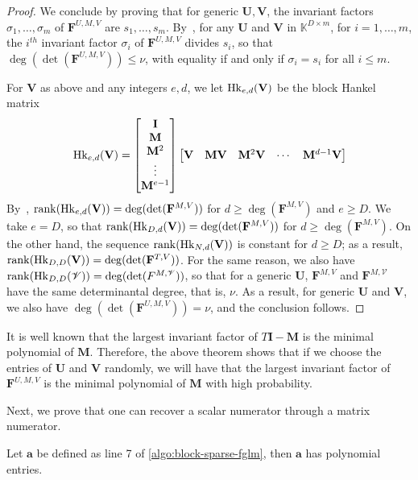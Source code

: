 \documentclass[12pt]{article}
\def\K {\ensuremath{\mathbb{K}}}
\def\scrV {\ensuremath{\mathscr{V}}}
\def\K{\mathbb{K}}
\def\mF{\mathbf{F}}
\def\mI{\mathbf{I}}
\def\mM{\mathbf{M}}
\def\mU{\mathbf{U}}
\def\mV{\mathbf{V}}
\begin{document}
\begin{proof}
	We conclude by proving that for generic $\mU,\mV$, the invariant factors
	$\sigma_1,\dots,\sigma_m$ of $\mF^{U,M,V}$ are $s_1,\dots,s_m$.
	By~\cite[Theorem~2.12]{KaVi04}, for any $\mU$ and $\mV$ in $\K^{D\times
		m}$, for $i=1,\dots,m$, the $i^{th}$ invariant factor $\sigma_i$ of
	$\mF^{U,M,V}$ divides $s_i$, so that $\deg(\det(\mF^{U,M,V}))\le\nu$, with
	equality if and only if $\sigma_i=s_i$ for all $i \le m$.
	
	For $\mV$ as above and any integers $e,d$, we let ${\rm Hk}_{e,d}(\mV)$ be
	the block Hankel matrix
	$$ {\rm Hk}_{e,d}(\mV) =
	\begin{bmatrix}
	\mI \\  \mM \\  \mM^2 \\ \vdots  \\  \mM^{e-1}
	\end{bmatrix}
	\begin{bmatrix}
	\mV & \mM\mV & \mM^2\mV &\cdots&  \mM^{d-1}\mV
	\end{bmatrix}
	$$ By~\cite[Eq.~(2.6)]{KaVi04}, ${\rm rank}({\rm Hk}_{e,d}(\mV)) =
	\deg(\det(\mF^{M,V}))$ for $d \ge \deg(\mF^{M,V})$ and $e \ge D$.  We take
	$e=D$, so that ${\rm rank}({\rm Hk}_{D,d}(\mV)) = \deg(\det(\mF^{M,V}))$
	for $d \ge \deg(\mF^{M,V})$. On the other hand, the sequence ${\rm
		rank}({\rm Hk}_{N,d}(\mV))$ is constant for $d \ge D$; as a result,
	${\rm rank}({\rm Hk}_{D,D}(\mV)) = \deg(\det(\mF^{T,V}))$. For the same
	reason, we also have ${\rm rank}({\rm Hk}_{D,D}(\scrV)) =
	\deg(\det(F^{M,\scrV}))$, so that for a generic $\mU$, $\mF^{M,V}$ and
	$\mF^{M,\scrV}$ have the same determinantal degree, that is, $\nu$.  As
	a result, for generic $\mU$ and $\mV$, we also have
	$\deg(\det(\mF^{U,M,V}))=\nu$, and the conclusion follows.
\end{proof} 

It is well known that the largest invariant factor of
$T\mI - \mM$ is the minimal polynomial of $\mM$. Therefore, the above
theorem shows that if we choose the entries of $\mU$ and $\mV$
randomly, we will have that the
largest invariant factor of $\mF^{U,M,V}$ is the minimal
polynomial of $\mM	$  with high probability.

Next, we prove that one can recover a scalar numerator
through a matrix numerator.

\begin{lemma}\label{utilde}
	Let $\textbf{a}$ be defined as line 7 of \cref{algo:block-sparse-fglm}, 
	then $\textbf{a}$ has polynomial entries.
\end{lemma}
\end{document}
